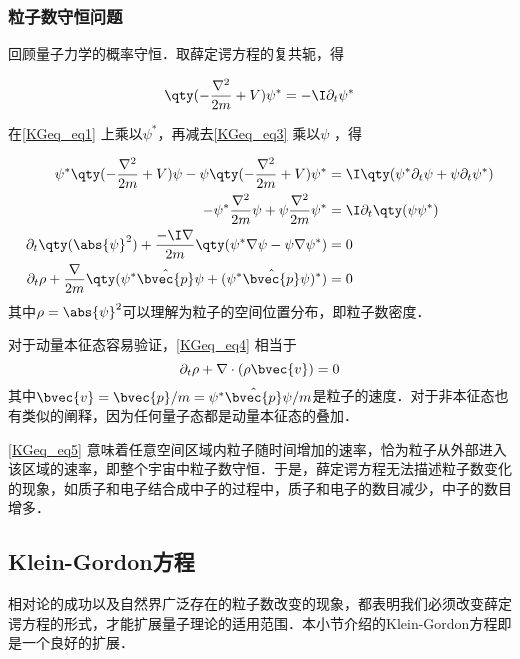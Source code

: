 \subsubsection{粒子数守恒问题}

回顾量子力学的概率守恒．取薛定谔方程的复共轭，得

\begin{equation}\label{KGeq_eq3}
\qty(-\frac{\nabla^2}{2m}+V)\psi^* = -\I \partial_t \psi^*
\end{equation}

在\autoref{KGeq_eq1} 上乘以$\psi^*$，再减去\autoref{KGeq_eq3} 乘以$\psi$ ，得

\begin{equation}\label{KGeq_eq4}
\begin{aligned}
\psi^*\qty(-\frac{\nabla^2}{2m}+V)\psi - \psi\qty(-\frac{\nabla^2}{2m}+V)\psi^* &= \I\qty(\psi^*\partial_t\psi + \psi\partial_t\psi^*)\\
-\psi^*\frac{\nabla^2}{2m}\psi + \psi\frac{\nabla^2}{2m}\psi^* &= \I \partial_t\qty(\psi\psi^*)\\
\partial_t\qty(\abs{\psi}^2) + \frac{-\I\nabla}{2m}\qty(\psi^*\nabla\psi-\psi\nabla\psi^*) &= 0\\
\partial_t \rho + \frac{\nabla}{2m} \qty(\psi^*\hat{\bvec{p}}\psi + (\psi^*\hat{\bvec{p}}\psi)^*) &= 0
\end{aligned}
\end{equation}
其中$\rho=\abs{\psi}^2$可以理解为粒子的空间位置分布，即粒子数密度．

对于动量本征态容易验证，\autoref{KGeq_eq4} 相当于
\begin{equation}\label{KGeq_eq5}
\partial_t\rho + \nabla\cdot(\rho \bvec{v}) = 0
\end{equation}
其中$\bvec{v}=\bvec{p}/m=\psi^*\hat{\bvec{p}}\psi/m$是粒子的速度．对于非本征态也有类似的阐释，因为任何量子态都是动量本征态的叠加．

\autoref{KGeq_eq5} 意味着任意空间区域内粒子随时间增加的速率，恰为粒子从外部进入该区域的速率，即整个宇宙中粒子数守恒．于是，薛定谔方程无法描述粒子数变化的现象，如质子和电子结合成中子的过程中，质子和电子的数目减少，中子的数目增多．



\subsection{Klein-Gordon方程}

相对论的成功以及自然界广泛存在的粒子数改变的现象，都表明我们必须改变薛定谔方程的形式，才能扩展量子理论的适用范围．本小节介绍的Klein-Gordon方程即是一个良好的扩展．

